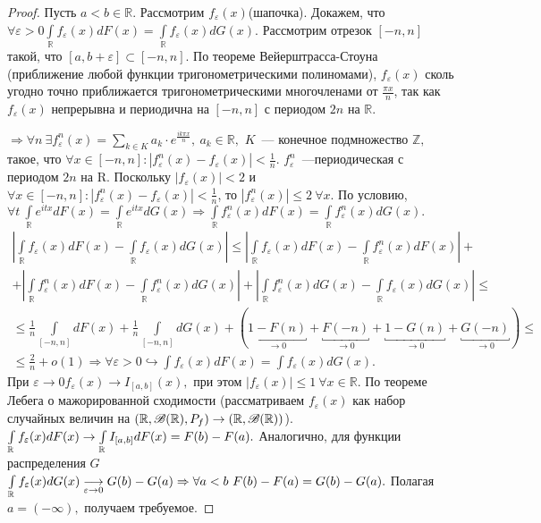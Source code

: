 	\begin{proof}
		Пусть \(a < b \in \mathbb{R}\). Рассмотрим \(f_\varepsilon(x)\)(шапочка). Докажем, что \(\forall \varepsilon > 0 \int\limits_{\mathbb{R}} f_\varepsilon(x) dF(x) = \int\limits_\mathbb{R}f_\varepsilon(x)dG(x).\) Рассмотрим отрезок \([-n, n]\) такой, что \([a, b + \varepsilon] \subset [-n, n].\) По теореме Вейерштрасса-Стоуна (приближение любой функции тригонометрическими полиномами), \(f_\varepsilon(x)\) сколь угодно точно приближается тригонометрическими многочленами от \(\frac{\pi x}{n}\), так как \(f_\varepsilon(x)\) непрерывна и периодична на \([-n, n]\) с периодом \(2n\) на \(\mathbb{R}\).

		\noindent \(\Rightarrow \forall n ~ \exists f_\varepsilon^n(x) = \sum\limits_{k \in K} a_k\cdot e^{\frac{ik\pi x}{n}}, ~a_k \in \mathbb{R},\) \(K\)~--- конечное подмножество \(\mathbb{Z},\) такое, что \(\forall x \in [-n, n]: |f_\varepsilon^n(x) - f_\varepsilon(x)| < \frac{1}{n}.\) \(f_\varepsilon^n\)~---периодическая с периодом \(2n\) на \(\mathrm{R}\). Поскольку \(|f_\varepsilon(x)| < 2\) и \(\forall x \in [-n, n]: |f_\varepsilon^n(x) - f_\varepsilon(x)| < \frac{1}{n}\), то \(|f_\varepsilon^n(x)| \leqslant 2 ~ \forall x.\) По условию, \(\forall t~\int\limits_\mathbb{R} e^{itx}dF(x) = \int\limits_\mathbb{R} e^{itx}dG(x) \Rightarrow \int\limits_\mathbb{R} f_\varepsilon^n(x)dF(x) = \int\limits_\mathbb{R} f_\varepsilon^n(x)dG(x).\)
		\begin{gather*}
			\left|\int\limits_\mathbb{R} f_\varepsilon(x) dF(x) - \int\limits_\mathbb{R} f_\varepsilon(x)dG(x)\right| \leqslant \left|\int\limits_\mathbb{R} f_\varepsilon(x) dF(x) - \int\limits_\mathbb{R} f_\varepsilon^n(x) dF(x)\right| +\\
			+  \left|\int\limits_\mathbb{R} f_\varepsilon^n(x) dF(x) - \int\limits_\mathbb{R} f_\varepsilon^n(x) dG(x)\right| + \left|\int\limits_\mathbb{R} f_\varepsilon^n(x) dG(x) - \int\limits_\mathbb{R} f_\varepsilon(x) dG(x)\right| \leqslant\\
			\leqslant \frac{1}{n} \int\limits_{[-n,n]}dF(x) + \frac{1}{n} \int\limits_{[-n,n]}dG(x) +(\underbracket{1 - F(n)}_{\to 0} + \underbracket{F(-n)}_{\to 0} + \underbracket{1 - G(n)}_{\to 0} + \underbracket{G(-n)}_{\to 0}) \leqslant\\
			\leqslant \frac{2}{n} + o(1) \Rightarrow \forall \varepsilon> 0 \hookrightarrow \int f_\varepsilon(x) dF(x) = \int f_\varepsilon(x)dG(x).
		\end{gather*}
		При \(\varepsilon \to 0 f_\varepsilon(x) \to I_{[a,b]}(x),\) при этом \(|f_\varepsilon(x)| \leqslant 1~ \forall x \in \mathbb{R}.\) По теореме Лебега о мажорированной сходимости (рассматриваем \(f_\varepsilon(x)\) как набор случайных величин на \((\mathbb{R}, \mathscr{B}(\mathbb{R}), P_f) \to (\mathbb{R}, \mathscr{B}(\mathbb{R}))\)).
		\(\int\limits_{\mathbb{R}} f_\varepsilon(x)dF(x) \to \int\limits_{\mathbb{R}} I_{[a,b]}dF(x) = F(b) - F(a).\)
		Аналогично, для функции распределения \(G\) \(\int\limits_{\mathbb{R}} f_\varepsilon(x)dG(x) \underset{\varepsilon \to 0}{\longrightarrow} G(b) - G(a) \Rightarrow \forall a < b ~ F(b) - F(a) = G(b) - G(a).\)  Полагая \(a = (-\infty), \) получаем требуемое.
	\end{proof}

